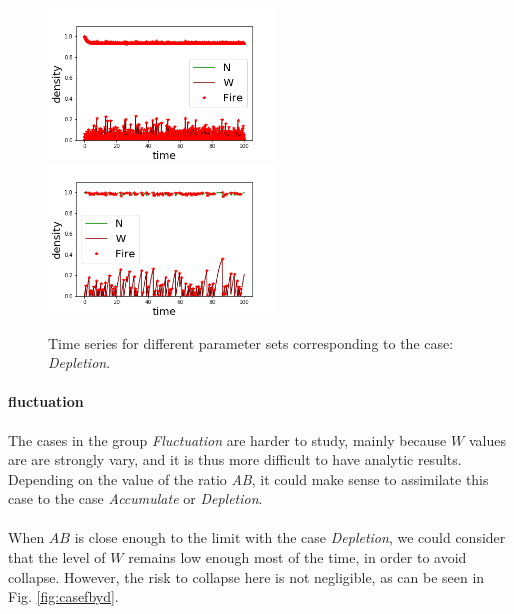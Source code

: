 \documentclass{article}
\begin{document}
\begin{figure}[h!]
\centering
\includegraphics[width=6cm]{continue_1.png}
\includegraphics[width=6cm]{continue_2.png}
\caption{Time series for different parameter sets corresponding to the case: \textit{Depletion}.}
\label{fig:cased}
\end{figure}



\newpage
\paragraph{fluctuation \\}
The cases in the group \textit{Fluctuation} are harder to study, mainly because $W$ values are are strongly vary, and it is thus more difficult to have analytic results. Depending on the value of the ratio \textit{AB}, it could make sense to assimilate this case to the case \textit{Accumulate} or \textit{Depletion}.

\paragraph{}
When $AB$ is close enough to the limit with the case \textit{Depletion}, we could consider that the level of $W$ remains low enough most of the time, in order to avoid collapse. However, the risk to collapse here is not negligible, as can be seen in Fig. \ref{fig:casefbyd}.
\end{document}
